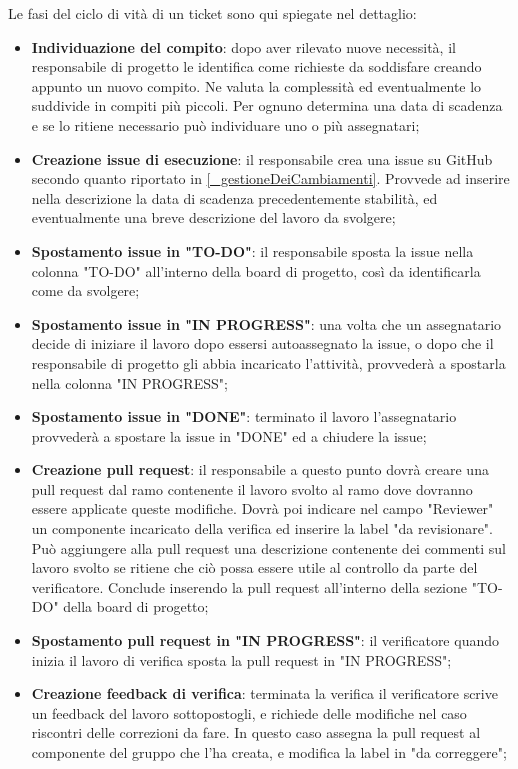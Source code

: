 Le fasi del ciclo di vità di un ticket sono qui spiegate nel dettaglio:
\begin{itemize}
    \item \textbf{Individuazione del compito}: dopo aver rilevato nuove necessità, il responsabile di progetto le identifica come richieste da soddisfare creando appunto un nuovo compito. Ne valuta la complessità ed eventualmente lo suddivide in compiti più piccoli. Per ognuno determina una data di scadenza e se lo ritiene necessario può individuare uno o più assegnatari;
    \item \textbf{Creazione issue di esecuzione}: il responsabile crea una issue su GitHub secondo quanto riportato in \ref{_gestioneDeiCambiamenti}. Provvede ad inserire nella descrizione la data di scadenza precedentemente stabilità, ed eventualmente una breve descrizione del lavoro da svolgere;
    \item \textbf{Spostamento issue in "TO-DO"}: il responsabile sposta la issue nella colonna "TO-DO" all'interno della board di progetto, così da identificarla come da svolgere;
    \item \textbf{Spostamento issue in "IN PROGRESS"}: una volta che un assegnatario decide di iniziare il lavoro dopo essersi autoassegnato la issue, o dopo che il responsabile di progetto gli abbia incaricato l'attività, provvederà a spostarla nella colonna "IN PROGRESS";
    \item \textbf{Spostamento issue in "DONE"}: terminato il lavoro l'assegnatario provvederà a spostare la issue in "DONE" ed a chiudere la issue;
    \item \textbf{Creazione pull request}: il responsabile a questo punto dovrà creare una pull request dal ramo contenente il lavoro svolto al ramo dove dovranno essere applicate queste modifiche. Dovrà poi indicare nel campo "Reviewer" un componente incaricato della verifica ed inserire la label "da revisionare". Può aggiungere alla pull request una descrizione contenente dei commenti sul lavoro svolto se ritiene che ciò possa essere utile al controllo da parte del verificatore. Conclude inserendo la pull request all'interno della sezione "TO-DO" della board di progetto;
    \item \textbf{Spostamento pull request in "IN PROGRESS"}: il verificatore quando inizia il lavoro di verifica sposta la pull request in "IN PROGRESS";
    \item \textbf{Creazione feedback di verifica}: terminata la verifica il verificatore scrive un feedback del lavoro sottopostogli, e richiede delle modifiche nel caso riscontri delle correzioni da fare. In questo caso assegna la pull request al componente del gruppo che l'ha creata, e modifica la label in "da correggere";

\end{itemize}
